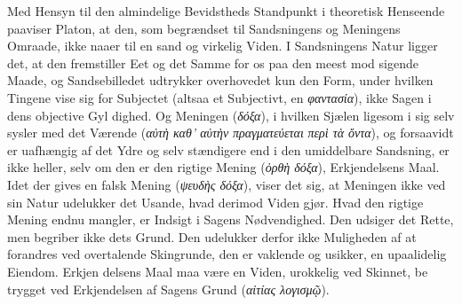 \documentclass[12pt,a4paper]{book}
\newcommand{\gk}[1]{\textit{#1}}
\begin{document}
Med Hensyn til den almindelige Bevidstheds Standpunkt
i theoretisk Henseende paaviser Platon, at den, som begrændset
til Sandsningens og Meningens Omraade, ikke naaer til en
sand og virkelig Viden. I Sandsningens Natur ligger det, at
den fremstiller Eet og det Samme for os paa den meest mod\-%
sigende Maade, og Sandsebilledet udtrykker overhovedet kun
den Form, under hvilken Tingene vise sig for Subjectet (altsaa
et Subjectivt, en \gk{φαντασία}), ikke Sagen i dens objective Gyl\-%
dighed. Og Meningen (\gk{δόξα}), i hvilken Sjælen ligesom i sig
selv sysler med det Værende (\gk{αὐτὴ καθ' αὐτὴν πραγματεύεται}
\gk{περὶ τὰ ὄντα}), og forsaavidt er uafhængig af det Ydre og selv\-%
stændigere end i den umiddelbare Sandsning, er ikke heller,
selv om den er den rigtige Mening (\gk{ὀρθὴ δόξα}), Erkjendelsens
Maal. Idet der gives en falsk Mening (\gk{ψευδὴς δόξα}), viser det
sig, at Meningen ikke ved sin Natur udelukker det Usande,
hvad derimod Viden gjør. Hvad den rigtige Mening endnu
mangler, er Indsigt i Sagens Nødvendighed. Den udsiger det
Rette, men begriber ikke dets Grund. Den udelukker derfor
ikke Muligheden af at forandres ved overtalende Skingrunde,
den er vaklende og usikker, en upaalidelig Eiendom. Erkjen\-%
delsens Maal maa være en Viden, urokkelig ved Skinnet, be\-%
trygget ved Erkjendelsen af Sagens Grund (\gk{αἰτίας λογισμῷ}).
\end{document}

